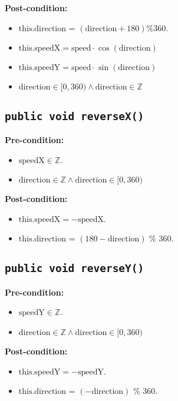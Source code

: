 \documentclass{article}
\begin{document}
\textbf{Post-condition:}
\begin{itemize}
    \item \( \text{this.direction} \) = \( (\text{direction} + 180) \% 360 \).
    \item \( \text{this.speedX} = \text{speed} \cdot \cos(\text{direction}) \)
    \item \( \text{this.speedY} = \text{speed} \cdot \sin(\text{direction}) \)
    \item \( \text{direction} \in [0,360) \wedge \text{direction} \in \mathbb{Z} \)
\end{itemize}

\subsection*{\texttt{public void reverseX()}}
\textbf{Pre-condition:}
\begin{itemize}
    \item \( \text{speedX} \in \mathbb{Z} \).
    \item \( \text{direction} \in \mathbb{Z} \wedge \text{direction} \in [0,360) \)
\end{itemize}

\textbf{Post-condition:}
\begin{itemize}
    \item \( \text{this.speedX} = -\text{speedX} \).
    \item \( \text{this.direction} \) = \( (180 - \text{direction}) \) \% 360.
\end{itemize}

\subsection*{\texttt{public void reverseY()}}
\textbf{Pre-condition:}
\begin{itemize}
    \item \( \text{speedY} \in \mathbb{Z} \).
    \item \( \text{direction} \in \mathbb{Z} \wedge \text{direction} \in [0,360) \)
\end{itemize}

\textbf{Post-condition:}
\begin{itemize}
    \item \( \text{this.speedY} = -\text{speedY} \).
    \item \( \text{this.direction} \) = \( (-\text{direction}) \) \% 360.
\end{itemize}
\end{document}
